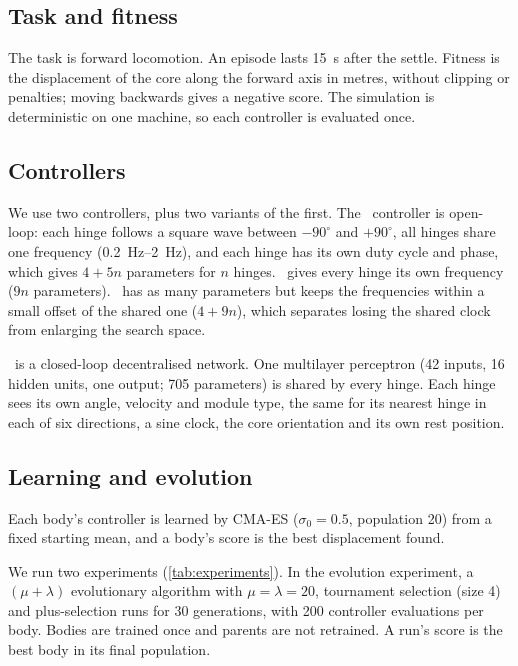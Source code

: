 \subsection{Task and fitness}
\label{sec:task}

The task is forward locomotion. An episode lasts \SI{15}{s} after the settle. Fitness is the displacement of the core along the forward axis in metres, without clipping or penalties; moving backwards gives a negative score. The simulation is deterministic on one machine, so each controller is evaluated once.

\subsection{Controllers}
\label{sec:brains}

We use two controllers, plus two variants of the first. The \bb\ controller is open-loop: each hinge follows a square wave between $-90^\circ$ and $+90^\circ$, all hinges share one frequency (\SIrange{0.2}{2}{Hz}), and each hinge has its own duty cycle and phase, which gives $4 + 5n$ parameters for $n$ hinges. \Bbfree\ gives every hinge its own frequency ($9n$ parameters). \Bbdrift\ has as many parameters but keeps the frequencies within a small offset of the shared one ($4 + 9n$), which separates losing the shared clock from enlarging the search space.

\dann\ is a closed-loop decentralised network. One multilayer perceptron (42 inputs, 16 hidden units, one output; 705 parameters) is shared by every hinge. Each hinge sees its own angle, velocity and module type, the same for its nearest hinge in each of six directions, a sine clock, the core orientation and its own rest position.

\subsection{Learning and evolution}
\label{sec:learning}

Each body's controller is learned by CMA-ES ($\sigma_0 = 0.5$, population 20) from a fixed starting mean, and a body's score is the best displacement found.

We run two experiments (\cref{tab:experiments}). In the evolution experiment, a $(\mu + \lambda)$ evolutionary algorithm with $\mu = \lambda = 20$, tournament selection (size 4) and plus-selection runs for 30 generations, with 200 controller evaluations per body. Bodies are trained once and parents are not retrained. A run's score is the best body in its final population.


